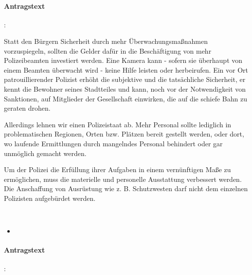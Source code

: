 
\\

\paragraph{Antragstext}:

Statt den Bürgern Sicherheit durch mehr Überwachungsmaßnahmen vorzuspiegeln, sollten die Gelder dafür in die Beschäftigung von mehr Polizeibeamten investiert werden. Eine Kamera kann - sofern sie überhaupt von einem Beamten überwacht wird - keine Hilfe leisten oder herbeirufen. Ein vor Ort patrouillierender Polizist erhöht die subjektive und die tatsächliche Sicherheit, er kennt die Bewohner {\Gu}seines{\Go} Stadtteiles und kann, noch vor der Notwendigkeit von Sanktionen, auf Mitglieder der Gesellschaft einwirken, die auf die schiefe Bahn zu geraten drohen.

Allerdings lehnen wir einen Polizeistaat ab. Mehr Personal sollte lediglich in problematischen Regionen, Orten bzw. Plätzen bereit gestellt werden, oder dort, wo laufende Ermittlungen durch mangelndes Personal behindert oder gar unmöglich gemacht werden.

Um der Polizei die Erfüllung ihrer Aufgaben in einem vernünftigen Maße zu ermöglichen, muss die materielle und personelle Ausstattung verbessert werden. Die Anschaffung von Ausrüstung wie z. B. Schutzwesten darf nicht dem einzelnen Polizisten aufgebürdet werden. 



\label{wpa:smsnotruf2}
\\
\begin{itemize}
\item {}
\end{itemize}

\paragraph{Antragstext}:

